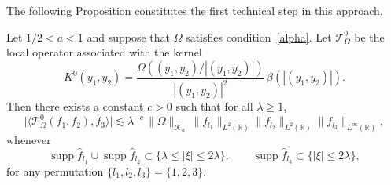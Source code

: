 \documentclass[11pt]{amsart}
\begin{document}
The following Proposition constitutes the first technical step in this approach.

\begin{proposition}\label{prop_decay_strong}
	Let \( 1/2 < a < 1 \) and suppose that $\Omega$ satisfies condition~\eqref{alpha}.
	Let \( \mathcal {T}_\Omega^0 \) be the local operator associated with the kernel
	\[
	K^0(y_1,y_2)
	=
	\frac{\Omega\!\left((y_1,y_2)/|(y_1,y_2)|\right)}{|(y_1,y_2)|^2}\,\beta\!\left(|(y_1,y_2)|\right).
	\]
	Then there exists a constant \( c > 0 \) such that for all \( \lambda \ge 1 \),
	\begin{equation}\label{eqT12-Ka}
		\big|\langle \mathcal {T}_\Omega^0(f_1,f_2),f_3\rangle\big|
		\lesssim
		\lambda^{-c}\,
		\|\Omega\|_{\mathcal K_a}\,
		\|f_{l_1}\|_{L^2(\mathbb R)}
		\|f_{l_2}\|_{L^2(\mathbb R)}
		\|f_{l_3}\|_{L^\infty(\mathbb R)},
	\end{equation}
	whenever
	\[
	\operatorname{supp}\widehat f_{l_1}\cup \operatorname{supp}\widehat f_{l_2}
	\subset \{\lambda\le |\xi|\le 2\lambda\},
	\qquad
	\operatorname{supp}\widehat f_{l_3}\subset \{|\xi|\le 2\lambda\},
	\]
	for any permutation $\{l_1,l_2,l_3\}=\{1,2,3\}$.
\end{proposition}
\end{document}
